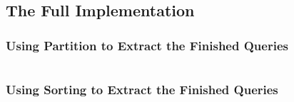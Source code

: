 \subsection{The Full Implementation}
\label{sec:full}








\subsubsection{Using Partition to Extract the Finished Queries}


\begin{listing}[H]
\begin{verbatim}

\end{verbatim}
\caption{.}
\label{lst:par}
\end{listing}




\subsubsection{Using Sorting to Extract the Finished Queries}

\begin{listing}[H]
\begin{verbatim}

\end{verbatim}
\caption{.}
\label{lst:sor}
\end{listing}





\subsubsection{}




